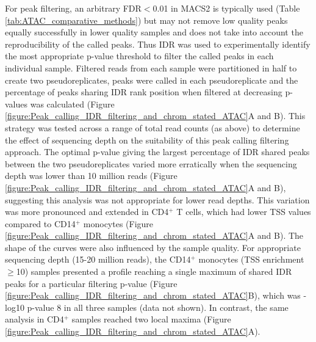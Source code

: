 For peak filtering, an arbitrary FDR$<$0.01 in MACS2 is typically used (Table \ref{tab:ATAC_comparative_methods}) but may not remove low quality peaks equally successfully in lower quality samples and does not take into account the reproducibility of the called peaks. Thus IDR was used to experimentally identify the most appropriate p-value threshold to filter the called peaks in each individual sample. Filtered reads from each sample were partitioned in half to create two pseudoreplicates, peaks were called in each pseudoreplicate and the percentage of peaks sharing IDR rank position when filtered at decreasing p-values was calculated (Figure \ref{figure:Peak_calling_IDR_filtering_and_chrom_stated_ATAC}A and B). This strategy was tested across a range of total read counts (as above) to determine the effect of sequencing depth on the suitability of this peak calling filtering approach. The optimal p-value giving the largest percentage of IDR shared peaks between the two pseudoreplicates varied more erratically when the sequencing depth was lower than 10 million reads (Figure \ref{figure:Peak_calling_IDR_filtering_and_chrom_stated_ATAC}A and B), suggesting this analysis was not appropriate for lower read depths. This variation was more pronounced and extended in CD4$^+$ T cells, which had lower TSS values compared to CD14$^+$ monocytes (Figure \ref{figure:Peak_calling_IDR_filtering_and_chrom_stated_ATAC}A and B). The shape of the curves were also influenced by the sample quality. For appropriate sequencing depth (15-20 million reads), the CD14$^+$ monocytes (TSS enrichment $\geq$10) samples presented a profile reaching a single maximum of shared IDR peaks for a particular filtering p-value (Figure \ref{figure:Peak_calling_IDR_filtering_and_chrom_stated_ATAC}B), which was -log10 p-value 8 in all three samples (data not shown). In contrast, the same analysis in CD4$^+$ samples reached two local maxima (Figure \ref{figure:Peak_calling_IDR_filtering_and_chrom_stated_ATAC}A). 



